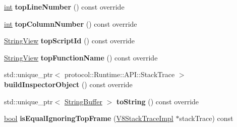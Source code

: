 \begin{DoxyCompactItemize}
\mbox{\hyperlink{classint}{int}} {\bfseries top\+Line\+Number} () const override
\item 
\mbox{\label{classv8__inspector_1_1V8StackTraceImpl_ab08c492b32303a57fa0d418b621bdb70}} 
\mbox{\hyperlink{classint}{int}} {\bfseries top\+Column\+Number} () const override
\item 
\mbox{\label{classv8__inspector_1_1V8StackTraceImpl_a118c47c0dacc32ddbc8479b3acf36dc5}} 
\mbox{\hyperlink{classv8__inspector_1_1StringView}{String\+View}} {\bfseries top\+Script\+Id} () const override
\item 
\mbox{\label{classv8__inspector_1_1V8StackTraceImpl_adced2e05e2f064807ee08a7c26643997}} 
\mbox{\hyperlink{classv8__inspector_1_1StringView}{String\+View}} {\bfseries top\+Function\+Name} () const override
\item 
\mbox{\label{classv8__inspector_1_1V8StackTraceImpl_ab269e301c2b53dadc6503fbe7e84bed7}} 
std\+::unique\+\_\+ptr$<$ protocol\+::\+Runtime\+::\+A\+P\+I\+::\+Stack\+Trace $>$ {\bfseries build\+Inspector\+Object} () const override
\item 
\mbox{\label{classv8__inspector_1_1V8StackTraceImpl_a385077fa1e169662af03a6ae228e2842}} 
std\+::unique\+\_\+ptr$<$ \mbox{\hyperlink{classv8__inspector_1_1StringBuffer}{String\+Buffer}} $>$ {\bfseries to\+String} () const override
\item 
\mbox{\label{classv8__inspector_1_1V8StackTraceImpl_aab3be05a2f9ad30cc8a4d493faff95e9}} 
\mbox{\hyperlink{classbool}{bool}} {\bfseries is\+Equal\+Ignoring\+Top\+Frame} (\mbox{\hyperlink{classv8__inspector_1_1V8StackTraceImpl}{V8\+Stack\+Trace\+Impl}} $\ast$stack\+Trace) const
\end{DoxyCompactItemize}
